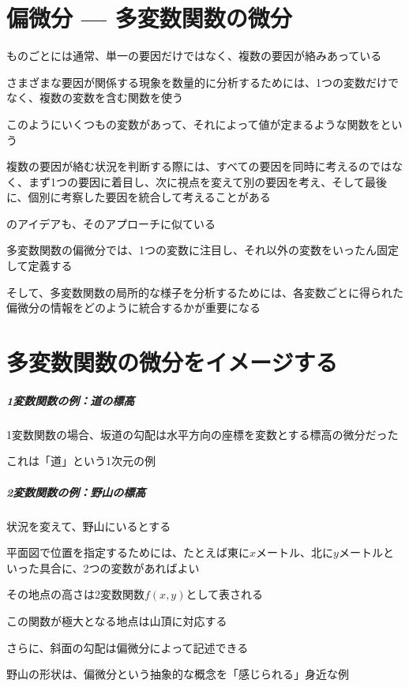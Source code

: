 \documentclass[../book_jiriki_calc]{subfiles}
\begin{document}
\section{偏微分 --- 多変数関数の微分}

ものごとには通常、単一の要因だけではなく、複数の要因が絡みあっている

さまざまな要因が関係する現象を数量的に分析するためには、1つの変数だけでなく、複数の変数を含む関数を使う

このようにいくつもの変数があって、それによって値が定まるような関数をという

\sectionline

複数の要因が絡む状況を判断する際には、すべての要因を同時に考えるのではなく、まず1つの要因に着目し、次に視点を変えて別の要因を考え、そして最後に、個別に考察した要因を統合して考えることがある

\br

のアイデアも、そのアプローチに似ている

多変数関数の偏微分では、1つの変数に注目し、それ以外の変数をいったん固定して定義する

そして、多変数関数の局所的な様子を分析するためには、各変数ごとに得られた偏微分の情報をどのように統合するかが重要になる

\section{多変数関数の微分をイメージする}

\subparagraph{1変数関数の例：道の標高}\quad

1変数関数の場合、坂道の勾配は水平方向の座標を変数とする標高の微分だった

これは「道」という1次元の例

\br

\subparagraph{2変数関数の例：野山の標高}\quad

状況を変えて、野山にいるとする

平面図で位置を指定するためには、たとえば東に$x$メートル、北に$y$メートルといった具合に、2つの変数があればよい

その地点の高さは2変数関数$f(x, y)$として表される

この関数が極大となる地点は山頂に対応する

さらに、斜面の勾配は偏微分によって記述できる

野山の形状は、偏微分という抽象的な概念を「感じられる」身近な例

\br
\end{document}
